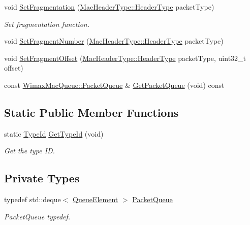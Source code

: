 \begin{DoxyCompactItemize}
\item 
void \hyperlink{classns3_1_1WimaxMacQueue_a7f76b9df9eb4acabad4609839ecda8f1}{Set\+Fragmentation} (\hyperlink{classns3_1_1MacHeaderType_a54d8fc8bc93a2b7865627965cdd31c20}{Mac\+Header\+Type\+::\+Header\+Type} packet\+Type)
\begin{DoxyCompactList}\small\item\em Set fragmentation function. \end{DoxyCompactList}\item 
void \hyperlink{classns3_1_1WimaxMacQueue_a7dc69d2eec5b050e18852796e502610e}{Set\+Fragment\+Number} (\hyperlink{classns3_1_1MacHeaderType_a54d8fc8bc93a2b7865627965cdd31c20}{Mac\+Header\+Type\+::\+Header\+Type} packet\+Type)
\item 
void \hyperlink{classns3_1_1WimaxMacQueue_a9cbf603913fc930f22d8ba27c14838e1}{Set\+Fragment\+Offset} (\hyperlink{classns3_1_1MacHeaderType_a54d8fc8bc93a2b7865627965cdd31c20}{Mac\+Header\+Type\+::\+Header\+Type} packet\+Type, uint32\+\_\+t offset)
\item 
const \hyperlink{classns3_1_1WimaxMacQueue_a075c9b703ce5eef7fe1844db1758657a}{Wimax\+Mac\+Queue\+::\+Packet\+Queue} \& \hyperlink{classns3_1_1WimaxMacQueue_ac996262c39bc2fb4ab9fac11cc407803}{Get\+Packet\+Queue} (void) const 
\end{DoxyCompactItemize}
\subsection*{Static Public Member Functions}
\begin{DoxyCompactItemize}
\item 
static \hyperlink{classns3_1_1TypeId}{Type\+Id} \hyperlink{classns3_1_1WimaxMacQueue_a50fd99b4012ead0ccedac32ca0a7d597}{Get\+Type\+Id} (void)
\begin{DoxyCompactList}\small\item\em Get the type ID. \end{DoxyCompactList}\end{DoxyCompactItemize}
\subsection*{Private Types}
\begin{DoxyCompactItemize}
\item 
typedef std\+::deque$<$ \hyperlink{structns3_1_1WimaxMacQueue_1_1QueueElement}{Queue\+Element} $>$ \hyperlink{classns3_1_1WimaxMacQueue_a075c9b703ce5eef7fe1844db1758657a}{Packet\+Queue}
\begin{DoxyCompactList}\small\item\em Packet\+Queue typedef. \end{DoxyCompactList}\end{DoxyCompactItemize}
